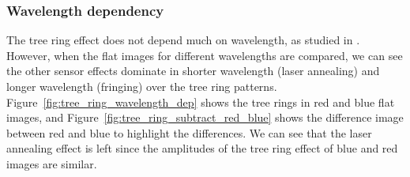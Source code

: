 \subsubsection{Wavelength dependency}
The tree ring effect does not depend much on wavelength, as studied in \citep{2017Jinst..12C05015,2020JATIS...6a1005P}. However, when the flat images for different wavelengths are compared, we can see the other sensor effects dominate in shorter wavelength (laser annealing) and longer wavelength (fringing) over the tree ring patterns. Figure~\ref{fig:tree_ring_wavelength_dep} shows the tree rings in red and blue flat images, and Figure~\ref{fig:tree_ring_subtract_red_blue} shows the difference image between red and blue to highlight the differences. We can see that the laser annealing effect is left since the amplitudes of the tree ring effect of blue and red images are similar. 


